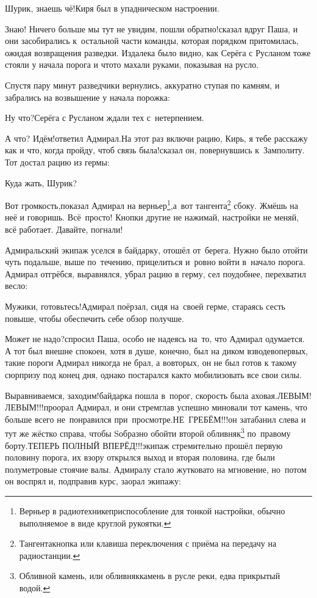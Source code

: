 \diagdash Шурик, знаешь чё!\mdash Киря был в упадническом настроении.

\diagdash Знаю! Ничего больше мы тут не увидим, пошли обратно!\mdash сказал вдруг Паша, и они засобирались к~остальной части команды, которая порядком притомилась, ожидая возвращения разведки. Издалека было видно, как Серёга с Русланом тоже стояли у начала порога и что\sdash то махали руками, показывая на русло.

Спустя пару минут разведчики вернулись, аккуратно ступая по камням, и забрались на возвышение у начала порожка:

\diagdash Ну что?\mdash Серёга с Русланом ждали тех с~нетерпением.

\diagdash А что? Идём!\mdash ответил Адмирал.\mdash На этот раз включи рацию, Кирь, я тебе расскажу как и что, когда пройду, чтоб связь была!\mdash сказал он, повернувшись к~Замполиту. Тот достал рацию из гермы:

\diagdash Куда жать, Шурик?

\renewcommand*{\thefootnote}{\arabic{footnote}}
\setcounter{footnote}{0}
\diagdash Вот громкость,\mdash показал Адмирал на верньер\footnote{Верньер в радиотехнике\mdash приспособление для тонкой настройки, обычно выполняемое в виде круглой рукоятки.},\mdash а~вот тангента\footnote{Тангента\mdash кнопка или клавиша переключения с приёма на передачу на радиостанции.} сбоку. Жмёшь на неё и говоришь. Всё~просто! Кнопки другие не нажимай, настройки не меняй, всё работает. Давайте, погнали!

Адмиральский экипаж уселся в байдарку, отошёл от~берега. Нужно было отойти чуть подальше, выше по~течению, прицелиться и~ровно войти в~начало порога. Адмирал отгрёбся, выравнялся, убрал рацию в герму, сел поудобнее, перехватил весло: 

\diagdash Мужики, готовьтесь!\mdash Адмирал поёрзал, сидя на~своей герме, стараясь сесть повыше, чтобы обеспечить себе обзор получше.

\diagdash Может не надо?\mdash спросил Паша, особо не надеясь на~то, что Адмирал одумается. А тот был внешне спокоен, хотя в душе, конечно, был на диком взводе\mdash во\sdash первых, такие пороги Адмирал никогда не брал, а во\sdash вторых, он не был готов к такому сюрпризу под конец дня, однако постарался как\sdash то мобилизовать все свои силы.

\renewcommand*{\thefootnote}{\fnsymbol{footnote}}
\setcounter{footnote}{0}
\diagdash Выравниваемся, заходим!\mdash байдарка пошла в~порог, скорость была аховая.\mdash ЛЕВЫМ! ЛЕВЫМ!!!\mdash проорал Адмирал, и они стремглав успешно миновали тот камень, что больше всего не~понравился при~просмотре.\mdash НЕ~ГРЕБЁМ!!!\mdash он затабанил слева и тут же жёстко справа, чтобы S\sdash образно обойти второй обливняк\footnote{Обливной камень, или обливняк\mdash камень в русле реки, едва прикрытый водой.} по~правому борту.\mdash ТЕПЕРЬ ПОЛНЫЙ ВПЕРЁД!!!\mdash экипаж стремительно прошёл первую половину порога, их взору открылся выход и вторая половина, где были полуметровые стоячие валы. Адмиралу стало жутковато на мгновение, но~потом он воспрял и, подправив курс, заорал экипажу:

